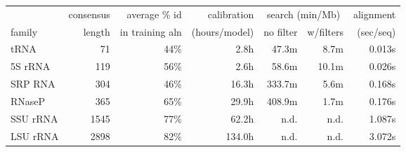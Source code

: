 \newpage
\begin{table}
\begin{center}
\begin{tabular}{lrr|r|rr|r|} 
       & consensus & average \% id   & calibration  & \multicolumn{2}{c|}{search (min/Mb)} & alignment \\
family & length    & in training aln & (hours/model)& no filter & w/filters & (sec/seq) \\ \hline
tRNA    & 71       & 44\%            &       2.8h   &     47.3m &       8.7m&  0.013s \\
5S rRNA & 119      & 56\%            &       2.6h   &     58.6m &      10.1m&  0.026s \\
SRP RNA & 304      & 46\%            &      16.3h   &    333.7m &       5.6m&  0.168s \\
RNaseP  & 365      & 65\%            &      29.9h   &    408.9m &       1.7m&  0.176s \\
SSU rRNA& 1545     & 77\%            &      62.2h   &      n.d. &       n.d.&  1.087s \\
LSU rRNA& 2898     & 82\%            &     134.0h   &      n.d. &       n.d.&  3.072s \\
\end{tabular}
%
% 
% 
%
%
%
% 
% 

\end{center}
\end{table}
